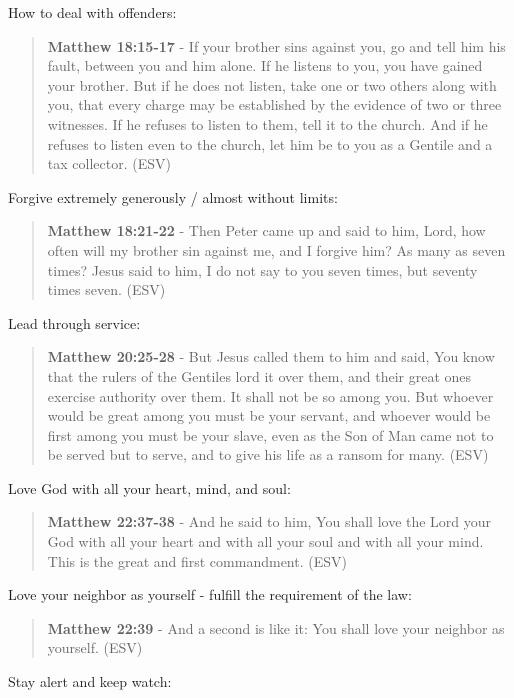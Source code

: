 \documentclass[11pt]{article}
\begin{document}
How to deal with offenders:

\begin{quote}
\textbf{Matthew 18:15-17} - If your brother sins against you, go and tell him his fault, between you and him alone. If he listens to you, you have gained your brother. But if he does not listen, take one or two others along with you, that every charge may be established by the evidence of two or three witnesses. If he refuses to listen to them, tell it to the church. And if he refuses to listen even to the church, let him be to you as a Gentile and a tax collector. (ESV)
\end{quote}

Forgive extremely generously / almost without limits:

\begin{quote}
\textbf{Matthew 18:21-22} - Then Peter came up and said to him, Lord, how often will my brother sin against me, and I forgive him? As many as seven times? Jesus said to him, I do not say to you seven times, but seventy times seven. (ESV)
\end{quote}

Lead through service:

\begin{quote}
\textbf{Matthew 20:25-28} - But Jesus called them to him and said, You know that the rulers of the Gentiles lord it over them, and their great ones exercise authority over them. It shall not be so among you. But whoever would be great among you must be your servant, and whoever would be first among you must be your slave, even as the Son of Man came not to be served but to serve, and to give his life as a ransom for many. (ESV)
\end{quote}

Love God with all your heart, mind, and soul:

\begin{quote}
\textbf{Matthew 22:37-38} - And he said to him, You shall love the Lord your God with all your heart and with all your soul and with all your mind. This is the great and first commandment. (ESV)
\end{quote}

Love your neighbor as yourself - fulfill the requirement of the law:

\begin{quote}
\textbf{Matthew 22:39} - And a second is like it: You shall love your neighbor as yourself. (ESV)
\end{quote}

Stay alert and keep watch:
\end{document}
